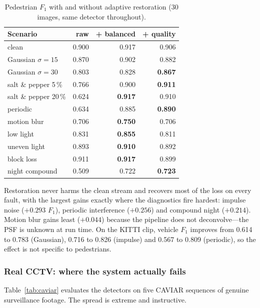 \documentclass[conference,10pt]{IEEEtran}
\newcommand{\hdr}[1]{\textbf{#1}}
\begin{document}
\begin{table}[!t]
\caption{Pedestrian $F_1$ with and without adaptive restoration (30 images,
same detector throughout).}
\label{tab:robust}
\centering
\scriptsize
\begin{tabular}{@{}lrrr@{}}
\toprule
\hdr{Scenario} & \hdr{raw} & \hdr{+ balanced} & \hdr{+ quality} \\
\midrule
clean              & 0.900 & 0.917 & 0.906 \\
Gaussian $\sigma{=}15$ & 0.870 & 0.902 & 0.882 \\
Gaussian $\sigma{=}30$ & 0.803 & 0.828 & \textbf{0.867} \\
salt \& pepper 5\,\%   & 0.766 & 0.900 & \textbf{0.911} \\
salt \& pepper 20\,\%  & 0.624 & \textbf{0.917} & 0.910 \\
periodic               & 0.634 & 0.885 & \textbf{0.890} \\
motion blur            & 0.706 & \textbf{0.750} & 0.706 \\
low light              & 0.831 & \textbf{0.855} & 0.811 \\
uneven light           & 0.893 & \textbf{0.910} & 0.892 \\
block loss             & 0.911 & \textbf{0.917} & 0.899 \\
night compound         & 0.509 & 0.722 & \textbf{0.723} \\
\bottomrule
\end{tabular}
\end{table}

Restoration never harms the clean stream and recovers most of the loss on every
fault, with the largest gains exactly where the diagnostics fire hardest:
impulse noise ($+0.293$ $F_1$), periodic interference ($+0.256$) and compound
night ($+0.214$). Motion blur gains least ($+0.044$) because the pipeline does
not deconvolve---the PSF is unknown at run time. On the KITTI clip, vehicle
$F_1$ improves from 0.614 to 0.783 (Gaussian), 0.716 to 0.826 (impulse) and
0.567 to 0.809 (periodic), so the effect is not specific to pedestrians.

\subsubsection{Real CCTV: where the system actually fails}
Table~\ref{tab:caviar} evaluates the detectors on five CAVIAR sequences of
genuine surveillance footage. The spread is extreme and instructive.
\end{document}
